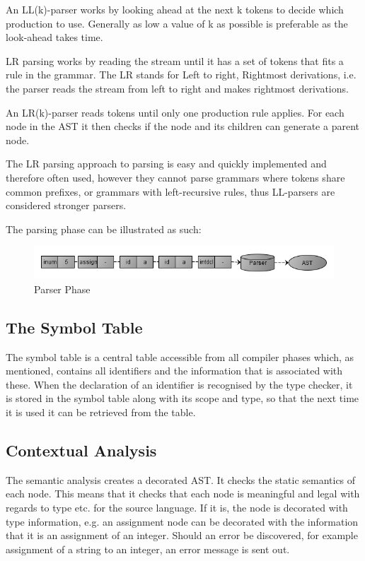 An LL(k)-parser works by looking ahead at the next k tokens to decide which production to use. Generally as low a value of k as possible is preferable as the look-ahead takes time. 

LR parsing works by reading the stream until it has a set of tokens that fits a rule in the grammar. The LR stands for Left to right, Rightmost derivations, i.e. the parser reads the stream from left to right and makes rightmost derivations.

An LR(k)-parser reads tokens until only one production rule applies. For each node in the AST it then checks if the node and its children can generate a parent node.

The LR parsing approach to parsing is easy and quickly implemented and therefore often used, however they cannot parse grammars where tokens share common prefixes, or grammars with left-recursive rules, thus LL-parsers are considered stronger parsers.

The parsing phase can be illustrated as such:

\begin{figure}[ht]
	\centering
		\includegraphics[scale = 0.5]{img/parser.png}
	\caption{Parser Phase}
	\label{fig:parser}
\end{figure}

\subsection{The Symbol Table}

The symbol table is a central table accessible from all compiler phases which, as mentioned, contains all identifiers and the information that is associated with these. When the declaration of an identifier is recognised by the type checker, it is stored in the symbol table along with its scope and type, so that the next time it is used it can be retrieved from the table.

\subsection{Contextual Analysis}
The semantic analysis creates a decorated AST. It checks the static semantics of each node. This means that it checks that each node is meaningful and legal with regards to type etc. for the source language. If it is, the node is decorated with type information, e.g. an assignment node can be decorated with the information that it is an assignment of an integer. Should an error be discovered, for example assignment of a string to an integer, an error message is sent out. 

